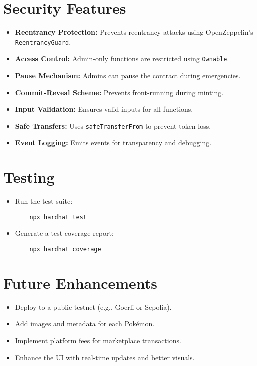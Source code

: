 \documentclass{article}
\begin{document}
\section{Security Features}
\begin{itemize}
    \item \textbf{Reentrancy Protection:} Prevents reentrancy attacks using OpenZeppelin's \texttt{ReentrancyGuard}.
    \item \textbf{Access Control:} Admin-only functions are restricted using \texttt{Ownable}.
    \item \textbf{Pause Mechanism:} Admins can pause the contract during emergencies.
    \item \textbf{Commit-Reveal Scheme:} Prevents front-running during minting.
    \item \textbf{Input Validation:} Ensures valid inputs for all functions.
    \item \textbf{Safe Transfers:} Uses \texttt{safeTransferFrom} to prevent token loss.
    \item \textbf{Event Logging:} Emits events for transparency and debugging.
\end{itemize}

\section{Testing}
\begin{itemize}
    \item Run the test suite:
    \begin{lstlisting}
    npx hardhat test
    \end{lstlisting}
    \item Generate a test coverage report:
    \begin{lstlisting}
    npx hardhat coverage
    \end{lstlisting}
\end{itemize}

\section{Future Enhancements}
\begin{itemize}
    \item Deploy to a public testnet (e.g., Goerli or Sepolia).
    \item Add images and metadata for each Pokémon.
    \item Implement platform fees for marketplace transactions.
    \item Enhance the UI with real-time updates and better visuals.
\end{itemize}
\end{document}
